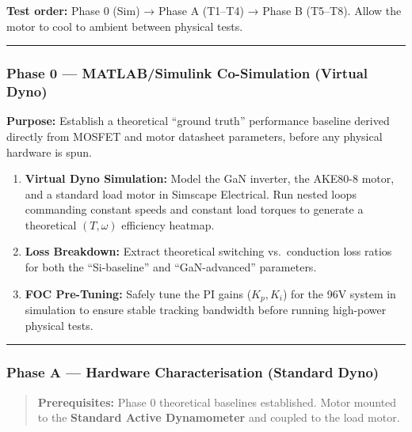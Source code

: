 \documentclass[
]{article}
\providecommand{\tightlist}{%
  \setlength{\itemsep}{0pt}\setlength{\parskip}{0pt}}
\begin{document}
\textbf{Test order:} Phase 0 (Sim) → Phase A (T1--T4) → Phase B
(T5--T8). Allow the motor to cool to ambient between physical tests.

\begin{center}\rule{0.5\linewidth}{0.5pt}\end{center}

\subsubsection{Phase 0 --- MATLAB/Simulink Co-Simulation (Virtual
Dyno)}\label{phase-0-matlabsimulink-co-simulation-virtual-dyno}

\textbf{Purpose:} Establish a theoretical ``ground truth'' performance
baseline derived directly from MOSFET and motor datasheet parameters,
before any physical hardware is spun.

\begin{enumerate}
\def\labelenumi{\arabic{enumi}.}
\tightlist
\item
  \textbf{Virtual Dyno Simulation:} Model the GaN inverter, the AKE80-8
  motor, and a standard load motor in Simscape Electrical. Run nested
  loops commanding constant speeds and constant load torques to generate
  a theoretical \((T, \omega)\) efficiency heatmap.
\item
  \textbf{Loss Breakdown:} Extract theoretical switching vs.~conduction
  loss ratios for both the ``Si-baseline'' and ``GaN-advanced''
  parameters.
\item
  \textbf{FOC Pre-Tuning:} Safely tune the PI gains (\(K_p, K_i\)) for
  the 96V system in simulation to ensure stable tracking bandwidth
  before running high-power physical tests.
\end{enumerate}

\begin{center}\rule{0.5\linewidth}{0.5pt}\end{center}

\subsubsection{Phase A --- Hardware Characterisation (Standard
Dyno)}\label{phase-a-hardware-characterisation-standard-dyno}

\begin{quote}
\textbf{Prerequisites:} Phase 0 theoretical baselines established. Motor
mounted to the \textbf{Standard Active Dynamometer} and coupled to the
load motor.
\end{quote}
\end{document}
